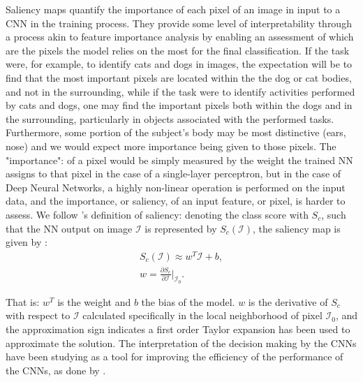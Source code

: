 Saliency maps quantify the importance of each pixel of an image in input to a CNN in the training process. They provide some level of interpretability through a process akin to feature importance analysis by enabling  an assessment of which are the pixels the model relies on the most for the final classification. If the task were, for example, to identify cats and dogs in images, the expectation will be to find that the most important pixels are located within the the dog or cat bodies, and not in the surrounding, while if the task were to identify activities performed by cats and dogs, one may find the important pixels both within the dogs and in the surrounding, particularly in objects associated with the performed tasks. Furthermore, some portion of the subject's body may be most distinctive (ears, nose) and we would expect more importance being given to those pixels. The "importance": of a pixel would be simply measured by the weight the trained NN assigns to that pixel in the case of a single-layer perceptron, but in the case of Deep Neural Networks, a highly non-linear operation is performed on the input data, and the importance, or saliency, of an input feature, or pixel, is harder to assess. We follow \citep{simonyan2014deep}'s definition of saliency: denoting the class score with $S_c$, such that the NN output on image $\mathcal{I}$ is represented by $S_c(\mathcal{I})$, the saliency map is given by :
\begin{eqnarray}
 S_c(\mathcal{I}) \approx w^T \mathcal{I} + b,\\
 w = \frac{\partial S_c}{\partial \mathcal{I}} \biggr\rvert_{\mathcal{I}_0}.
 \end{eqnarray}
 
That is: $w^T$ is the weight and $b$ the bias of the model. $w$ is the derivative of $S_c$ with respect to $\mathcal{I}$ calculated specifically in the local neighborhood of pixel $\mathcal{I}_0$, and the approximation sign indicates a first order Taylor expansion has been used to approximate the solution.
The interpretation of the decision making by the CNNs have been studying as a tool for improving the efficiency of the performance of the CNNs, as done by \citep{DBLP:journals/corr/abs-2105-00937}. 


